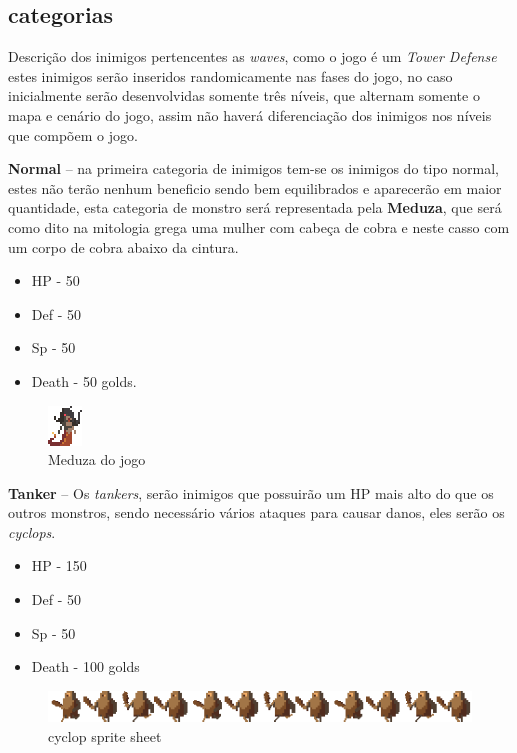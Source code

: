 \documentclass[11pt]{article} %
\begin{document}
\subsection{categorias}
Descrição dos inimigos pertencentes as \textit{waves}, como o jogo é um \textit{Tower Defense} estes inimigos serão inseridos randomicamente nas fases do jogo, no caso inicialmente serão desenvolvidas somente três níveis, que alternam somente o mapa e cenário do jogo, assim não haverá diferenciação dos inimigos nos níveis que compõem o jogo.

\textbf{{ {\large Normal}}} – na primeira categoria de inimigos tem-se os inimigos do tipo normal, estes não terão nenhum beneficio sendo bem equilibrados e aparecerão em maior quantidade, esta categoria de monstro será representada pela \textbf{Meduza}, que será como dito na mitologia grega uma mulher com cabeça de cobra e neste casso com um corpo de cobra abaixo da cintura.

\begin{itemize}
\item HP - 50
\item Def - 50
\item Sp - 50
\item Death - 50 golds.
\end{itemize}

\begin{figure}[!htp]
\centering
\includegraphics[scale=4]{res/characters/medusa.png}
\caption{Meduza do jogo}
\label{Meduza}
\end{figure}

\newpage

\textbf{{\large Tanker}} – Os \textit{tankers}, serão inimigos que possuirão um HP mais alto do que os outros monstros, sendo necessário vários ataques para causar danos, eles serão os \textit{cyclops}.
\begin{itemize}
\item HP - 150
\item Def - 50
\item Sp - 50
\item Death - 100 golds
\end{itemize}

\begin{figure}[!htp]
\centering
\includegraphics[scale=1]{res/characters/cyclop.png} 
\caption{cyclop sprite sheet}
\label{cyclops}
\end{figure}
\end{document}
